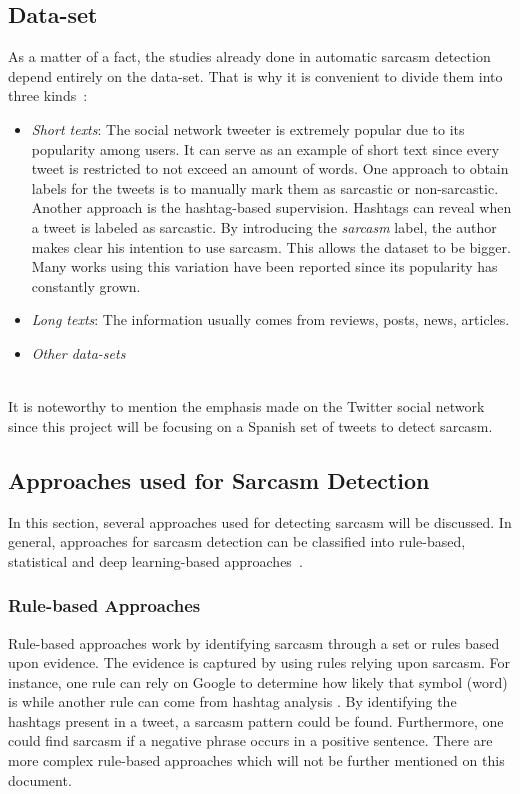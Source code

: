 \subsection{Data-set}

As a matter of a fact, the studies already done in automatic sarcasm detection depend entirely on the data-set. That is why it is convenient to divide them into three kinds~\cite{joshi2017automatic}:
\begin{itemize}
\item \textit{Short texts}: The social network tweeter is extremely popular due to its popularity among users. It can serve as an example of short text since every tweet is restricted to not exceed an amount of words. One approach to obtain labels for the tweets is to manually mark them as sarcastic or non-sarcastic. Another approach is the hashtag-based supervision. Hashtags can reveal when a tweet is labeled as sarcastic. By introducing the \textit{sarcasm} label, the author makes clear his intention to use sarcasm.  This allows the dataset to be bigger. Many works using this variation have been reported since its popularity has constantly grown.
    \item \textit{Long texts}: The information usually comes from reviews, posts, news, articles. 
    \item \textit{Other data-sets}
\end{itemize}
\\
It is noteworthy to mention the emphasis made on the Twitter social network since this project will be focusing on a Spanish set of tweets to detect sarcasm. 

\subsection{Approaches used for Sarcasm Detection}
In this section, several approaches used for detecting sarcasm will be discussed. In general, approaches for sarcasm detection can be classified into rule-based, statistical and deep learning-based approaches~\cite{joshi2017automatic}.
\subsubsection{Rule-based Approaches~\cite{joshi2017automatic}}
Rule-based approaches work by identifying sarcasm through a set or rules based upon evidence. The evidence is captured by using rules relying upon sarcasm. For instance, one rule can rely on Google to determine how likely that symbol (word) is while another rule can come from hashtag analysis . By identifying the hashtags present in a tweet, a sarcasm pattern could be found. Furthermore, one could find sarcasm if a negative phrase occurs in a positive sentence. There are more complex rule-based approaches which will not be further mentioned on this document.
